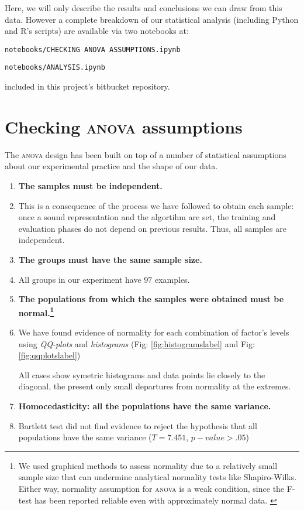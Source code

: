 Here, we will only describe the results and conclusions we can draw from this data. However a complete breakdown of our statistical analysis (including Python and R's scripts) are available via two notebooks at:

\begin{center}
  \texttt{notebooks/CHECKING ANOVA ASSUMPTIONS.ipynb}

  \texttt{notebooks/ANALYSIS.ipynb}
\end{center}

included in this project's bitbucket repository.

\section{Checking \textsc{anova} assumptions}

The \textsc{anova} design has been built on top of a number of statistical assumptions about our experimental practice and the shape of our data.

\begin{enumerate}
  \item {{\bf The samples must be independent.}}
  \item [] {
    This is a consequence of the process we have followed to obtain each sample: once a sound representation and the algortihm are set, the training and evaluation phases do not depend on previous results. Thus, all samples are independent.
  }
  \item {{\bf The groups must have the same sample size.}}
  \item [] {
    All groups in our experiment have $97$ examples.
  }
  \item {{\bf The populations from which the samples were obtained must be normal.\footnote{
  We used graphical methods to assess normality due to a relatively small sample size that can undermine analytical normality tests like Shapiro-Wilks. Either way, normality assumption for \textsc{anova} is a weak condition, since the F-test has been reported reliable even with approximately normal data. \citep{47, 48}
  }}}
  \item [] {
    We have found evidence of normality for each combination of factor's levels using {\it QQ-plots} and {\it histograms} (Fig: \ref{fig:histogramslabel} and Fig: \ref{fig:qqplotslabel})



    All cases show symetric histograms and data points lie closely to the diagonal, the present only small departures from normality at the extremes.

  }
  \item {{\bf Homocedasticity: all the populations have the same variance.}}
  \item []{
    Bartlett test did not find evidence to reject the hypothesis that all populations have the same variance ($T=7.451$, $p-value > .05$)
  }
\end{enumerate}


